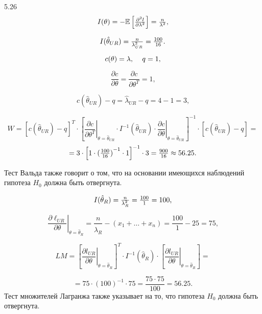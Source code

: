 \begin{solution}{{5.26}}
\[
I(\theta) =  - \mathbb{E}\left[ {{\textstyle{{{\partial ^2}l} \over {\partial {\lambda ^2}}}}} \right] = {\textstyle{n \over {{\lambda ^2}}}} \text{,}
\]

\[
I({\hat \theta_{UR}}) = {\textstyle{n \over {\lambda _{UR}^2}}} = {\textstyle{{100} \over {16}}} \text{.}
\]

\[
    c(\theta) = \lambda \text{, \quad} q = 1 \text{,}
\]

\[
\frac{{\partial c}}{{\partial \theta }} = \frac{{\partial c}}{{\partial {\theta ^T}}} = 1 \text{,}
\]

\[
c({\hat \theta _{UR}}) - q = {\hat \lambda _{UR}} - q = 4 - 1 = 3 \text{,}
\]


\[
W = {\left[ {c({{\hat \theta }_{UR}}) - q} \right]^T} \cdot {\left[ {{{\left. {\frac{{\partial c}}{{\partial {\theta ^T}}}} \right|}_{\theta  = {{\hat \theta }_{UR}}}} \cdot {I^{ - 1}}({{\hat \theta }_{UR}}) \cdot {{\left. {\frac{{\partial c}}{{\partial \theta }}} \right|}_{\theta  = {{\hat \theta }_{UR}}}}} \right]^{ - 1}} \cdot \left[ {c({{\hat \theta }_{UR}}) - q} \right] =
\]
\[
= 3 \cdot {\left[ {1 \cdot {{({\textstyle{{100} \over {16}}})}^{ - 1}} \cdot 1} \right]^{ - 1}} \cdot 3 = {\textstyle{{900} \over {16}}} \approx {{56}}{{.25}} \text{.}
\]

Тест Вальда также говорит о том, что на основании имеющихся наблюдений гипотеза $H_0$ должна быть отвергнута.

\[
I({\hat \theta _R}) = {\textstyle{n \over {\lambda _R^2}}} = {\textstyle{{100} \over 1}} = 100 \text{,}
\]

\[
{\left. {\frac{{\partial {\ell_{UR}}}}{{\partial \theta }}} \right|_{\theta  = {{\hat \theta }_R}}} = \frac{n}{{\hat \lambda }_R} - ({x_1} +  \ldots  + {x_n}) = \frac{{100}}{1} - 25 = 75 \text{,}
\]

\[
LM = {\left[ {{{\left. {\frac{{\partial {l_{UR}}}}{{\partial \theta }}} \right|}_{\theta  = {{\hat \theta }_R}}}} \right]^T} \cdot {I^{ - 1}}({\hat \theta _R}) \cdot \left[ {{{\left. {\frac{{\partial {l_{UR}}}}{{\partial \theta }}} \right|}_{\theta  = {{\hat \theta }_R}}}} \right] =
\]

\[
= 75 \cdot {(100)^{ - 1}} \cdot 75 = \frac{{75 \cdot 75}}{{100}} = {{56}}{{.25}} \text{.}
\]
Тест множителей Лагранжа также указывает на то, что гипотеза $H_0$ должна быть отвергнута.

\end{solution}
